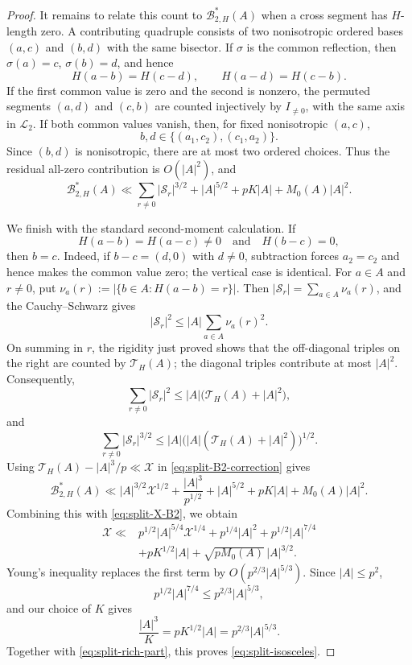 \documentclass[11pt]{article}
\begin{document}
\begin{proof}
It remains to relate this count to $\mathcal B_{2,H}^*(A)$ when a cross segment has $H$-length zero.  A contributing quadruple consists of two nonisotropic ordered bases $(a,c)$ and $(b,d)$ with the same bisector.  If $\sigma$ is the common reflection, then $\sigma(a)=c$, $\sigma(b)=d$, and hence
\[
 H(a-b)=H(c-d),
 \qquad
 H(a-d)=H(c-b).
\]
If the first common value is zero and the second is nonzero, the permuted segments $(a,d)$ and $(c,b)$ are counted injectively by $I_{\ne0}$, with the same axis in $\mathcal L_2$.  If both common values vanish, then, for fixed nonisotropic $(a,c)$,
\[
 b,d\in\{(a_1,c_2),(c_1,a_2)\}.
\]
Since $(b,d)$ is nonisotropic, there are at most two ordered choices.
Thus the residual all-zero contribution is $O(|A|^2)$, and
\begin{equation}
 \label{eq:split-B2-correction}
 \mathcal B_{2,H}^*(A)
 \ll
 \sum_{r\ne0}|\mathcal S_r|^{3/2}
 +|A|^{5/2}+pK|A|+M_0(A)|A|^2.
\end{equation}

We finish with the standard second-moment calculation.  If
\[
 H(a-b)=H(a-c)\ne0
 \quad\text{and}\quad
 H(b-c)=0,
\]
then $b=c$.  Indeed, if $b-c=(d,0)$ with $d\ne0$, subtraction forces
$a_2=c_2$ and hence makes the common value zero; the vertical case
is identical. 
For $a\in A$ and $r\ne0$, put $\nu_a(r):=|\{b\in A:H(a-b)=r\}|$. Then $|\mathcal S_r|=\sum_{a\in A}\nu_a(r)$, and the Cauchy--Schwarz gives
\[
 |\mathcal S_r|^2
 \le |A|\sum_{a\in A}\nu_a(r)^2.
\]
On summing in $r$, the rigidity just proved shows that the
off-diagonal triples on the right are counted by $\mathcal T_H(A)$;
the diagonal triples contribute at most $|A|^2$.  Consequently,
\[
 \sum_{r\ne0}|\mathcal S_r|^2
 \le |A|\bigl(\mathcal T_H(A)+|A|^2\bigr),
\]
and
\[
 \sum_{r\ne0}|\mathcal S_r|^{3/2}
 \le
 |A|\bigl(|A|(\mathcal T_H(A)+|A|^2)\bigr)^{1/2}.
\]
Using
$\mathcal T_H(A)-|A|^3/p\ll \mathcal{X}$ in
\eqref{eq:split-B2-correction} gives
\[
 \mathcal B_{2,H}^*(A)
 \ll
 |A|^{3/2}\mathcal{X}^{1/2}
 +\frac{|A|^3}{p^{1/2}}
 +|A|^{5/2}+pK|A|+M_0(A)|A|^2.
\]
Combining this with \eqref{eq:split-X-B2}, we obtain
\begin{align*}
 \mathcal{X}\ll{}&
 p^{1/2}|A|^{5/4}\mathcal{X}^{1/4}
 +p^{1/4}|A|^2
 +p^{1/2}|A|^{7/4}\\
 &+pK^{1/2}|A|
 +\sqrt{pM_0(A)}\,|A|^{3/2}.
\end{align*}
Young's inequality replaces the first term by
$O(p^{2/3}|A|^{5/3})$.  Since $|A|\le p^2$,
\[
 p^{1/2}|A|^{7/4}\le p^{2/3}|A|^{5/3},
\]
and our choice of $K$ gives
\[
 \frac{|A|^3}{K}=pK^{1/2}|A|=p^{2/3}|A|^{5/3}.
\]
Together with \eqref{eq:split-rich-part}, this proves
\eqref{eq:split-isosceles}.
\end{proof}
\end{document}
